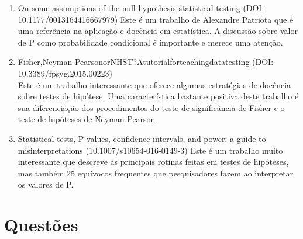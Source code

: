 \documentclass[
]{book}
\begin{document}
\begin{enumerate}
\def\labelenumi{\arabic{enumi}.}
\item
  On some assumptions of the null hypothesis statistical testing (DOI: 10.1177/0013164416667979)
  Este é um trabalho de Alexandre Patriota que é uma referência na aplicação e docência em estatística. A discussão sobre valor de P como probabilidade condicional é importante e merece uma atenção.
\item
  Fisher,Neyman-PearsonorNHST?Atutorialforteachingdatatesting (DOI: 10.3389/fpsyg.2015.00223)\\
  Este é um trabalho interessante que oferece algumas estratégias de docência sobre testes de hipótese. Uma característica bastante positiva deste trabalho é sua diferenciação dos procedimentos do teste de significância de Fisher e o teste de hipóteses de Neyman-Pearson
\item
  Statistical tests, P values, confidence intervals, and power: a guide to misinterpretations (10.1007/s10654-016-0149-3)
  Este é um trabalho muito interessante que descreve as principais rotinas feitas em testes de hipóteses, mas também 25 equívocos frequentes que pesquisadores fazem ao interpretar os valores de P.
\end{enumerate}

\hypertarget{questuxf5es-2}{%
\section{Questões}\label{questuxf5es-2}}
\end{document}
